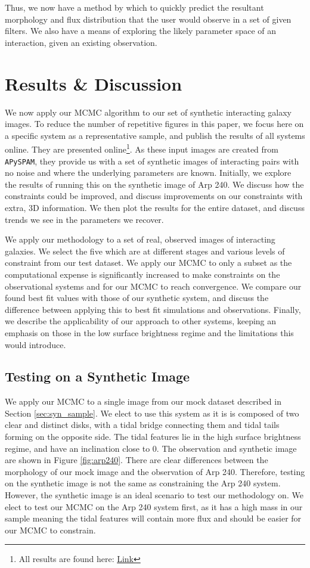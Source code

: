 Thus, we now have a method by which to quickly predict the resultant morphology and flux distribution that the user would observe in a set of given filters. We also have a means of exploring the likely parameter space of an interaction, given an existing observation.


\section{Results \& Discussion}\label{Results}
\noindent We now apply our MCMC algorithm to our set of synthetic interacting galaxy images. To reduce the number of repetitive figures in this paper, we focus here on a specific system as a representative sample, and publish the results of all systems online. They are presented online\footnote{All results are found here: \href{https://drive.google.com/drive/folders/1hlFhrdoZ50JaEWWYoy0RZ3J4LSoRjmsq?usp=sharing}{Link}}. As these input images are created from \texttt{APySPAM}, they provide us with a set of synthetic images of interacting pairs with no noise and where the underlying parameters are known. Initially, we explore the results of running this on the synthetic image of Arp 240. We discuss how the constraints could be improved, and discuss improvements on our constraints with extra, 3D information. We then plot the results for the entire dataset, and discuss trends we see in the parameters we recover.

We apply our methodology to a set of real, observed images of interacting galaxies. We select the five which are at different stages and various levels of constraint from our test dataset. We apply our MCMC to only a subset as the computational expense is significantly increased to make constraints on the observational systems and for our MCMC to reach convergence. We compare our found best fit values with those of our synthetic system, and discuss the difference between applying this to best fit simulations and observations. Finally, we describe the applicability of our approach to other systems, keeping an emphasis on those in the low surface brightness regime and the limitations this would introduce.

\subsection{Testing on a Synthetic Image}
We apply our MCMC to a single image from our mock dataset described in Section \ref{sec:syn_sample}. We elect to use this system as it is is composed of two clear and distinct disks, with a tidal bridge connecting them and tidal tails forming on the opposite side. The tidal features lie in the high surface brightness regime, and have an inclination close to 0. The observation and synthetic image are shown in Figure \ref{fig:arp240}. There are clear differences between the morphology of our mock image and the observation of Arp 240. Therefore, testing on the synthetic image is not the same as constraining the Arp 240 system. However, the synthetic image is an ideal scenario to test our methodology on. We elect to test our MCMC on the Arp 240 system first, as it has a high mass in our sample meaning the tidal features will contain more flux and should be easier for our MCMC to constrain.

